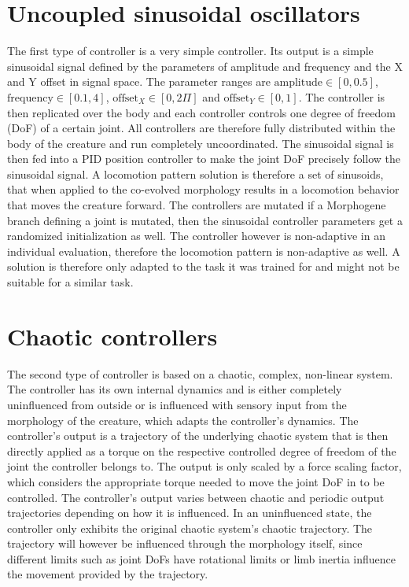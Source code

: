 \documentclass[main]{subfiles}
\begin{document}
\section{Uncoupled sinusoidal oscillators}
\label{sec:sinusoidal-oscillators}

The first type of controller is a very simple controller. Its output is a simple sinusoidal signal defined by the parameters of amplitude and frequency and the X and Y offset in signal space. The parameter ranges are $\text{amplitude} \in [0,0.5]$, $\text{frequency} \in [0.1,4]$, $\text{offset}_X \in [0,2\Pi]$ and $\text{offset}_Y \in [0,1]$. The controller is then replicated over the body and each controller controls one degree of freedom (DoF) of a certain joint. All controllers are therefore fully distributed within the body of the creature and run completely uncoordinated. The sinusoidal signal is then fed into a PID position controller to make the joint DoF precisely follow the sinusoidal signal. A locomotion pattern solution is therefore a set of sinusoids, that when applied to the co-evolved morphology results in a locomotion behavior that moves the creature forward. The controllers are mutated if a Morphogene branch defining a joint is mutated, then the sinusoidal controller parameters get a randomized initialization as well. The controller however is non-adaptive in an individual evaluation, therefore the locomotion pattern is non-adaptive as well. A solution is therefore only adapted to the task it was trained for and might not be suitable for a similar task.

\section{Chaotic controllers}
\label{sec:chaotic-controllers}

The second type of controller is based on a chaotic, complex, non-linear system. The controller has its own internal dynamics and is either completely uninfluenced from outside or is influenced with sensory input from the morphology of the creature, which adapts the controller's dynamics. The controller's output is a trajectory of the underlying chaotic system that is then directly applied as a torque on the respective controlled degree of freedom of the joint the controller belongs to. The output is only scaled by a force scaling factor, which considers the appropriate torque needed to move the joint DoF in to be controlled. The controller's output varies between chaotic and periodic output trajectories depending on how it is influenced. In an uninfluenced state, the controller only exhibits the original chaotic system's chaotic trajectory. The trajectory will however be influenced through the morphology itself, since different limits such as joint DoFs have rotational limits or limb inertia influence the movement provided by the trajectory.
\end{document}

